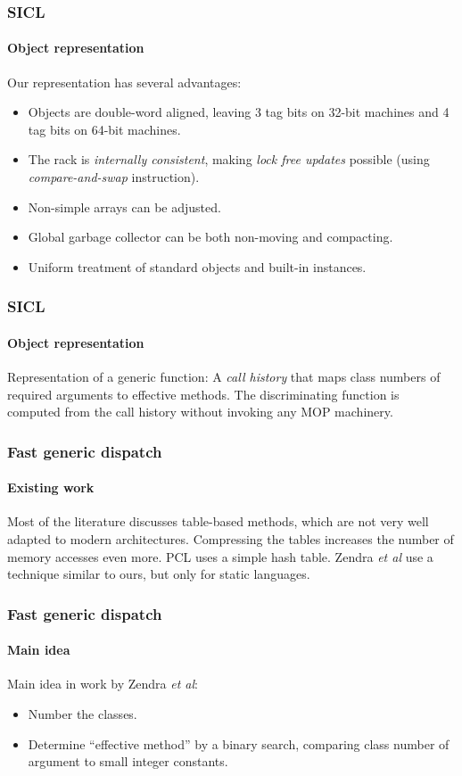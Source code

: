 \documentclass{beamer}
\begin{document}
\begin{frame}
  \frametitle{SICL}
  \framesubtitle{Object representation}

  Our representation has several advantages:

  \begin{itemize}
  \item Objects are double-word aligned, leaving 3 tag bits on 32-bit
    machines and 4 tag bits on 64-bit machines.  
  \item The rack is \emph{internally consistent}, making \emph{lock
    free updates} possible (using \emph{compare-and-swap}
    instruction).
  \item Non-simple arrays can be adjusted. 
  \item Global garbage collector can be both non-moving and
    compacting.
  \item Uniform treatment of standard objects and built-in instances. 
  \end{itemize}

\end{frame}
\begin{frame}
  \frametitle{SICL}
  \framesubtitle{Object representation}

  Representation of a generic function:
  \vskip 0.25cm
  A \emph{call history} that maps class numbers of required arguments
  to effective methods. 
  \vskip 0.25cm
  The discriminating function is computed from the call history
  without invoking any MOP machinery. 

\end{frame}
\begin{frame}
  \frametitle{Fast generic dispatch}
  \framesubtitle{Existing work}

  Most of the literature discusses table-based methods, which are not
  very well adapted to modern architectures.  Compressing the tables
  increases the number of memory accesses even more.
  \vskip 0.5cm
  PCL uses a simple hash table.
  \vskip 0.5cm
  Zendra \emph{et al} use a technique similar to ours, but only for
  static languages.

\end{frame}
\begin{frame}
  \frametitle{Fast generic dispatch}
  \framesubtitle{Main idea}

  Main idea in work by Zendra \emph{et al}:

  \begin{itemize}
  \item Number the classes.
  \item Determine ``effective method'' by a binary search, comparing
    class number of argument to small integer constants.
  \end{itemize}

\end{frame}
\end{document}
